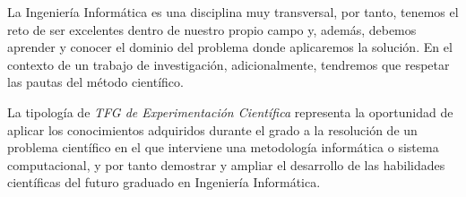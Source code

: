 La Ingeniería Informática es una disciplina muy transversal, por tanto, tenemos el reto de ser excelentes dentro de nuestro propio campo y, además, debemos aprender y conocer el dominio del problema donde aplicaremos la solución. En el contexto de un trabajo de investigación, adicionalmente, tendremos que respetar las pautas del método científico. 


La tipología de {\it TFG de Experimentación Científica} representa la oportunidad de aplicar los conocimientos adquiridos durante el grado a la resolución de un problema científico en el que interviene una metodología informática o sistema computacional, y por tanto demostrar y ampliar el desarrollo de las habilidades científicas del futuro graduado en Ingeniería Informática.

